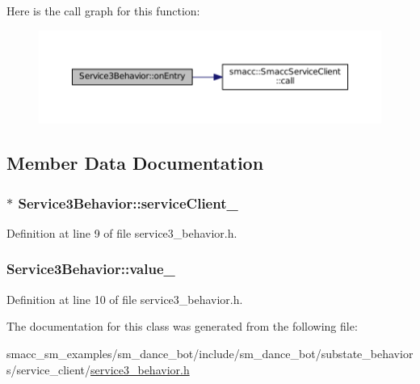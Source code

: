 Here is the call graph for this function\+:
\nopagebreak
\begin{figure}[H]
\begin{center}
\leavevmode
\includegraphics[width=350pt]{classService3Behavior_a914618fa7f8152868204543838cd8359_cgraph}
\end{center}
\end{figure}




\subsection{Member Data Documentation}
\subsubsection[{\texorpdfstring{service\+Client\+\_\+}{serviceClient_}}]{$\ast$ Service3\+Behavior\+::service\+Client\+\_\+\hspace{0.3cm}{\ttfamily [private]}}\hypertarget{classService3Behavior_af9320a57c796b75f10c722ba57a89b13}{}\label{classService3Behavior_af9320a57c796b75f10c722ba57a89b13}


Definition at line 9 of file service3\+\_\+behavior.\+h.

\subsubsection[{\texorpdfstring{value\+\_\+}{value_}}]{ Service3\+Behavior\+::value\+\_\+\hspace{0.3cm}{\ttfamily [private]}}\hypertarget{classService3Behavior_a63303d829c0433edf1a0bf104c386ac9}{}\label{classService3Behavior_a63303d829c0433edf1a0bf104c386ac9}


Definition at line 10 of file service3\+\_\+behavior.\+h.



The documentation for this class was generated from the following file\+:\begin{DoxyCompactItemize}
\item 
smacc\+\_\+sm\+\_\+examples/sm\+\_\+dance\+\_\+bot/include/sm\+\_\+dance\+\_\+bot/substate\+\_\+behaviors/service\+\_\+client/\hyperlink{service3__behavior_8h}{service3\+\_\+behavior.\+h}\end{DoxyCompactItemize}
